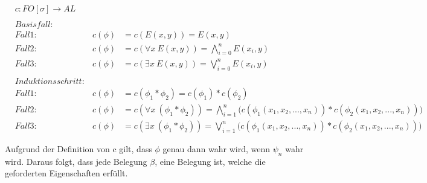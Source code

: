 \documentclass[a4paper,10pt]{article}
\begin{document}
\begin{align*}
&c: FO[\sigma] \rightarrow AL \\
&&\\
&Basisfall: & \\
&Fall1: &c(\phi) &= c(E(x,y)) = E(x,y) \\
&Fall2: &c(\phi) &= c(\forall x~ E(x,y)) = \bigwedge\limits_{i = 0}^n E(x_i,y) \\
&Fall3: &c(\phi) &= c(\exists x~ E(x,y)) = \bigvee\limits_{i = 0}^n E(x_i,y) \\
&&\\
&Induktionsschritt: &\\
&Fall 1: &c(\phi) &= c(\phi_1 * \phi_2) = c(\phi_1) * c(\phi_2) \\
&Fall 2: &c(\phi) &= c(\forall x~(\phi_1 * \phi_2)) = 
\bigwedge\limits_{i = 1}^n \Big( c(\phi_1(x_1,x_2,...,x_n)) * c(\phi_2(x_1,x_2,...,x_n)) \Big) \\
&Fall 3: &c(\phi) &= c(\exists x~(\phi_1 * \phi_2)) = 
\bigvee\limits_{i = 1}^n \Big( c(\phi_1(x_1,x_2,...,x_n)) * c(\phi_2(x_1,x_2,...,x_n)) \Big)
\end{align*}

Aufgrund der Definition von c gilt, dass $\phi$ genau dann wahr wird, wenn $\psi_n$ wahr wird. Daraus folgt, dass jede Belegung $\beta$, 
eine Belegung ist, welche die geforderten Eigenschaften erfüllt.
\end{document}
